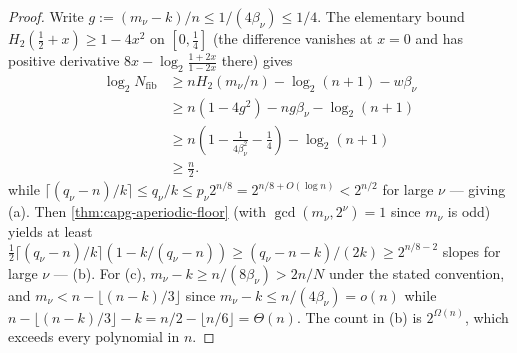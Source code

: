 \documentclass[11pt]{article}
\theoremstyle{definition}
\theoremstyle{remark}
\begin{document}
\begin{proof}
Write $g:=(m_\nu-k)/n\leq 1/(4\beta_\nu)\leq 1/4$.  The elementary bound
$H_2(\tfrac12+x)\geq 1-4x^{2}$ on $[0,\tfrac14]$ (the difference vanishes at
$x=0$ and has positive derivative $8x-\log_2\frac{1+2x}{1-2x}$ there) gives
\[
\begin{aligned}
\log_2 N_{\mathrm{fib}}
&\ge nH_2(m_\nu/n)-\log_2(n+1)-w\beta_\nu\\
&\ge n(1-4g^2)-ng\beta_\nu-\log_2(n+1)\\
&\ge n\left(1-\frac{1}{4\beta_\nu^2}-\frac14\right)-\log_2(n+1)\\
&\ge \frac n2.
\end{aligned}
\]
while $\lceil(q_\nu-n)/k\rceil\leq q_\nu/k\leq p_\nu 2^{n/8}=
2^{n/8+O(\log n)}<2^{n/2}$ for large $\nu$ --- giving (a).  Then
\cref{thm:capg-aperiodic-floor} (with $\gcd(m_\nu,2^\nu)=1$ since $m_\nu$ is
odd) yields at least
$\tfrac12\lceil(q_\nu-n)/k\rceil(1-k/(q_\nu-n))\geq
(q_\nu-n-k)/(2k)\geq 2^{n/8-2}$ slopes for large $\nu$ --- (b).  For (c),
$m_\nu-k\geq n/(8\beta_\nu)>2n/N$ under the stated convention, and
$m_\nu<n-\lfloor(n-k)/3\rfloor$ since $m_\nu-k\leq n/(4\beta_\nu)=o(n)$
while $n-\lfloor(n-k)/3\rfloor-k=n/2-\lfloor n/6\rfloor=\Theta(n)$.  The
count in (b) is $2^{\Omega(n)}$, which exceeds every polynomial in $n$.
\end{proof}
\end{document}
